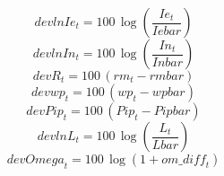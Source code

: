 \begin{dmath}
{devlnIe}_{t}=100\, \log\left(\frac{{Ie}_{t}}{{Iebar}}\right)
\end{dmath}
\begin{dmath}
{devlnIn}_{t}=100\, \log\left(\frac{{In}_{t}}{{Inbar}}\right)
\end{dmath}
\begin{dmath}
{devR}_{t}=100\, \left({rm}_{t}-{rmbar}\right)
\end{dmath}
\begin{dmath}
{devwp}_{t}=100\, \left({wp}_{t}-{wpbar}\right)
\end{dmath}
\begin{dmath}
{devPip}_{t}=100\, \left({Pip}_{t}-{Pipbar}\right)
\end{dmath}
\begin{dmath}
{devlnL}_{t}=100\, \log\left(\frac{{L}_{t}}{{Lbar}}\right)
\end{dmath}
\begin{dmath}
{devOmega}_{t}=100\, \log\left(1+{om\_diff}_{t}\right)
\end{dmath}
